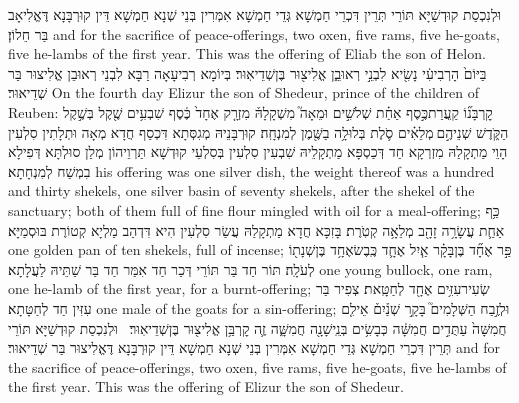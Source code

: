 {וּלְנִכְסַת קוּדְשַׁיָּא תּוֹרֵי תְּרֵין דִּכְרֵי חַמְשָׁא גְּדֵי חַמְשָׁא אִמְּרִין בְּנֵי שְׁנָא חַמְשָׁא דֵּין קוּרְבָּנָא דֶּאֱלִיאָב בַּר חֵלוֹן׃}
{and for the sacrifice of peace-offerings, two oxen, five rams, five he-goats, five he-lambs of the first year. This was the offering of Eliab the son of Helon.}{}
{בַּיּוֹם֙ הָרְבִיעִ֔י נָשִׂ֖יא לִבְנֵ֣י רְאוּבֵ֑ן אֱלִיצ֖וּר בֶּן\maqqaf שְׁדֵיאֽוּר׃}
{בְּיוֹמָא רְבִיעָאָה רַבָּא לִבְנֵי רְאוּבֵן אֱלִיצוּר בַּר שְׁדֵיאוּר׃}
{On the fourth day Elizur the son of Shedeur, prince of the children of Reuben:}{}
{קׇרְבָּנ֞וֹ קַֽעֲרַת\maqqaf כֶּ֣סֶף אַחַ֗ת שְׁלֹשִׁ֣ים וּמֵאָה֮ מִשְׁקָלָהּ֒ מִזְרָ֤ק אֶחָד֙ כֶּ֔סֶף שִׁבְעִ֥ים שֶׁ֖קֶל בְּשֶׁ֣קֶל הַקֹּ֑דֶשׁ שְׁנֵיהֶ֣ם \legarmeh  מְלֵאִ֗ים סֹ֛לֶת בְּלוּלָ֥ה בַשֶּׁ֖מֶן לְמִנְחָֽה׃}
{קוּרְבָּנֵיהּ מְגִסְּתָא דִּכְסַף חֲדָא מְאָה וּתְלָתִין סִלְעִין הָוֵי מַתְקָלַהּ מִזְרְקָא חַד דְּכַסְפָּא מַתְקָלֵיהּ שִׁבְעִין סִלְעִין בְּסִלְעֵי קוּדְשָׁא תַּרְוֵיהוֹן מְלַן סוּלְתָּא דְּפִילָא בִמְשַׁח לְמִנְחָתָא׃}
{his offering was one silver dish, the weight thereof was a hundred and thirty shekels, one silver basin of seventy shekels, after the shekel of the sanctuary; both of them full of fine flour mingled with oil for a meal-offering;}{}
{כַּ֥ף אַחַ֛ת עֲשָׂרָ֥ה זָהָ֖ב מְלֵאָ֥ה קְטֹֽרֶת׃}
{בָּזִכָּא חֲדָא מַתְקָלַהּ עֲשַׂר סִלְעִין הִיא דִּדְהַב מַלְיָא קְטוֹרֶת בּוּסְמַיָּא׃}
{one golden pan of ten shekels, full of incense;}{}
{פַּ֣ר אֶחָ֞ד בֶּן\maqqaf בָּקָ֗ר אַ֧יִל אֶחָ֛ד כֶּֽבֶשׂ\maqqaf אֶחָ֥ד בֶּן\maqqaf שְׁנָת֖וֹ לְעֹלָֽה׃}
{תּוֹר חַד בַּר תּוֹרֵי דְּכַר חַד אִמַּר חַד בַּר שַׁתֵּיהּ לַעֲלָתָא׃}
{one young bullock, one ram, one he-lamb of the first year, for a burnt-offering;}{}
{שְׂעִיר\maqqaf עִזִּ֥ים אֶחָ֖ד לְחַטָּֽאת׃}
{צְפִיר בַּר עִזִּין חַד לְחַטָּתָא׃}
{one male of the goats for a sin-offering;}{}
{וּלְזֶ֣בַח הַשְּׁלָמִים֮ בָּקָ֣ר שְׁנַ֒יִם֒ אֵילִ֤ם חֲמִשָּׁה֙ עַתֻּדִ֣ים חֲמִשָּׁ֔ה כְּבָשִׂ֥ים בְּנֵֽי\maqqaf שָׁנָ֖ה חֲמִשָּׁ֑ה זֶ֛ה קׇרְבַּ֥ן אֱלִיצ֖וּר בֶּן\maqqaf שְׁדֵיאֽוּר׃ \petucha }
{וּלְנִכְסַת קוּדְשַׁיָּא תּוֹרֵי תְּרֵין דִּכְרֵי חַמְשָׁא גְּדֵי חַמְשָׁא אִמְּרִין בְּנֵי שְׁנָא חַמְשָׁא דֵּין קוּרְבָּנָא דֶּאֱלִיצוּר בַּר שְׁדֵיאוּר׃}
{and for the sacrifice of peace-offerings, two oxen, five rams, five he-goats, five he-lambs of the first year. This was the offering of Elizur the son of Shedeur.}{}
